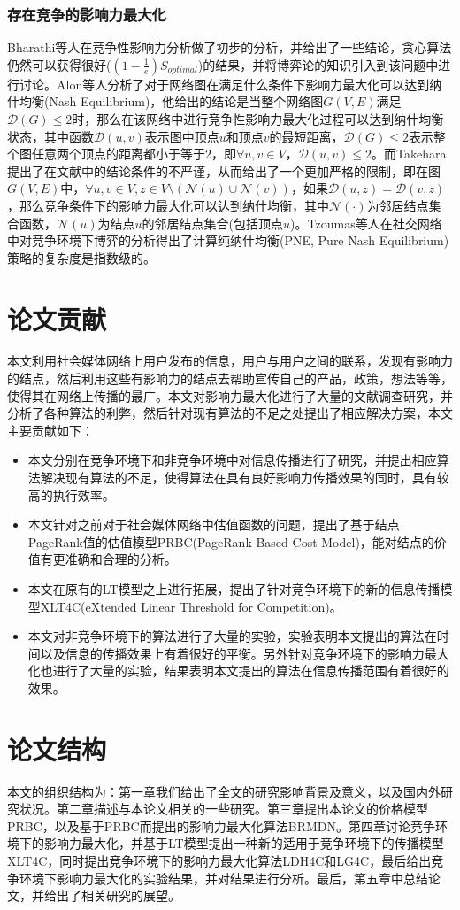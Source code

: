 \subsubsection{存在竞争的影响力最大化}
Bharathi\cite{bharathi2007competitive}等人在竞争性影响力分析做了初步的分析，并给出了一些结论，贪心算法仍然可以获得很好($(1-\frac{1}{e}) S_{optimal}$)的结果，并将博弈论的知识引入到该问题中进行讨论。Alon\cite{alon2010note}等人分析了对于网络图在满足什么条件下影响力最大化可以达到纳什均衡(Nash Equilibrium)，他给出的结论是当整个网络图$G(V, E)$满足$\mathcal{D}(G) \le 2$时，那么在该网络中进行竞争性影响力最大化过程可以达到纳什均衡状态，其中函数$\mathcal{D}(u, v)$表示图中顶点$u$和顶点$v$的最短距离，$\mathcal{D}(G) \le 2$表示整个图任意两个顶点的距离都小于等于$2$，即$\forall u, v \in V$，$\mathcal{D}(u,v) \le 2$。而Takehara\cite{takehara2012comment}提出了在文献\cite{alon2010note}中的结论条件的不严谨，从而给出了一个更加严格的限制，即在图$G(V, E)$中，$\forall u, v \in V, z \in V\setminus (\mathcal{N}(u)\cup\mathcal{N}(v))$，如果$\mathcal{D}(u,z)=\mathcal{D}(v,z)$，那么竞争条件下的影响力最大化可以达到纳什均衡，其中$\mathcal{N}(\cdot)$为邻居结点集合函数，$\mathcal{N}(u)$为结点$u$的邻居结点集合(包括顶点$u$)。Tzoumas\cite{tzoumas2012game}等人在社交网络中对竞争环境下博弈的分析得出了计算纯纳什均衡(PNE, Pure Nash Equilibrium)策略的复杂度是指数级的。


\section{论文贡献}
本文利用社会媒体网络上用户发布的信息，用户与用户之间的联系，发现有影响力的结点，然后利用这些有影响力的结点去帮助宣传自己的产品，政策，想法等等，使得其在网络上传播的最广。本文对影响力最大化进行了大量的文献调查研究，并分析了各种算法的利弊，然后针对现有算法的不足之处提出了相应解决方案，本文主要贡献如下：
\begin{itemize}
\item 本文分别在竞争环境下和非竞争环境中对信息传播进行了研究，并提出相应算法解决现有算法的不足，使得算法在具有良好影响力传播效果的同时，具有较高的执行效率。
\item 本文针对之前对于社会媒体网络中估值函数的问题，提出了基于结点PageRank值的估值模型PRBC(PageRank Based Cost Model)，能对结点的价值有更准确和合理的分析。
\item 本文在原有的LT模型之上进行拓展，提出了针对竞争环境下的新的信息传播模型XLT4C(eXtended Linear Threshold for Competition)。
\item 本文对非竞争环境下的算法进行了大量的实验，实验表明本文提出的算法在时间以及信息的传播效果上有着很好的平衡。另外针对竞争环境下的影响力最大化也进行了大量的实验，结果表明本文提出的算法在信息传播范围有着很好的效果。
\end{itemize}


\section{论文结构}
本文的组织结构为：第一章我们给出了全文的研究影响背景及意义，以及国内外研究状况。第二章描述与本论文相关的一些研究。第三章提出本论文的价格模型PRBC，以及基于PRBC而提出的影响力最大化算法BRMDN。第四章讨论竞争环境下的影响力最大化，并基于LT模型提出一种新的适用于竞争环境下的传播模型XLT4C，同时提出竞争环境下的影响力最大化算法LDH4C和LG4C，最后给出竞争环境下影响力最大化的实验结果，并对结果进行分析。最后，第五章中总结论文，并给出了相关研究的展望。